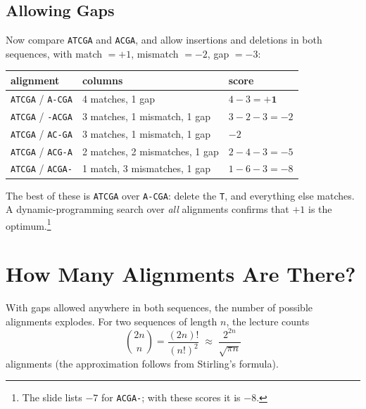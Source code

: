 \documentclass[11pt, oneside]{book}
\newcommand{\seq}[1]{\texttt{#1}}
\let\originalsection\section
\renewcommand{\section}{\Needspace{7\baselineskip}\originalsection}
\let\originalsubsection\subsection
\renewcommand{\subsection}{\Needspace{6\baselineskip}\originalsubsection}
\begin{document}
\subsection{Allowing Gaps}

Now compare \seq{ATCGA} and \seq{ACGA}, and allow insertions and deletions in
both sequences, with match $= +1$, mismatch $= -2$, gap $= -3$:

\begin{exbox}[title={Some alignments of \seq{ATCGA} and \seq{ACGA}}]
\centering
\small
\begin{tabular}{@{}lll@{}}
\toprule
alignment & columns & score \\
\midrule
\seq{ATCGA} / \seq{A-CGA} & 4 matches, 1 gap                  & $4 - 3 = \mathbf{+1}$ \\
\seq{ATCGA} / \seq{-ACGA} & 3 matches, 1 mismatch, 1 gap      & $3 - 2 - 3 = -2$ \\
\seq{ATCGA} / \seq{AC-GA} & 3 matches, 1 mismatch, 1 gap      & $-2$ \\
\seq{ATCGA} / \seq{ACG-A} & 2 matches, 2 mismatches, 1 gap    & $2 - 4 - 3 = -5$ \\
\seq{ATCGA} / \seq{ACGA-} & 1 match, 3 mismatches, 1 gap      & $1 - 6 - 3 = -8$ \\
\bottomrule
\end{tabular}

\raggedright
\medskip
The best of these is \seq{ATCGA} over \seq{A-CGA}: delete the \seq{T}, and
everything else matches. A dynamic-programming search over \emph{all}
alignments confirms that $+1$ is the optimum.\footnote{The slide lists $-7$ for
\seq{ACGA-}; with these scores it is $-8$.}
\end{exbox}

\section{How Many Alignments Are There?}

With gaps allowed anywhere in both sequences, the number of possible
alignments explodes. For two sequences of length $n$, the lecture counts
\[
  \binom{2n}{n} = \frac{(2n)!}{(n!)^2} \;\approx\; \frac{2^{2n}}{\sqrt{\pi n}}
\]
alignments (the approximation follows from Stirling's formula).
\end{document}
